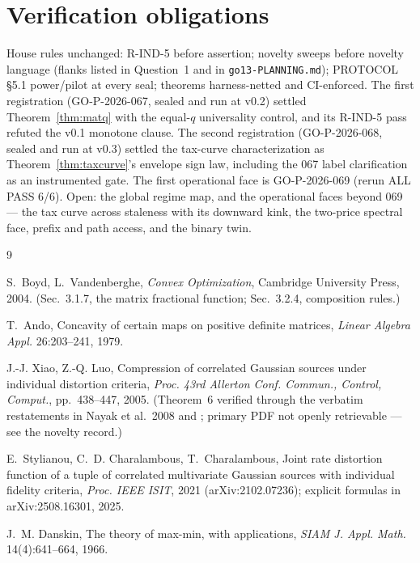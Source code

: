 ﻿\documentclass[11pt]{article}
\theoremstyle{remark}
\begin{document}
\section{Verification obligations}

House rules unchanged: R-IND-5 before assertion; novelty sweeps before
novelty language (flanks listed in Question~1 and in
\texttt{go13-PLANNING.md}); PROTOCOL \S5.1 power/pilot at every seal;
theorems harness-netted and CI-enforced. The first registration
(GO-P-2026-067, sealed and run at v0.2) settled
Theorem~\ref{thm:matq} with the equal-$q$ universality control, and
its R-IND-5 pass refuted the v0.1 monotone clause. The second
registration (GO-P-2026-068, sealed and run at v0.3) settled the
tax-curve characterization as Theorem~\ref{thm:taxcurve}'s envelope
sign law, including the 067 label clarification as an instrumented
gate. The first operational face is GO-P-2026-069 (rerun ALL PASS
6/6). Open: the global regime map, and the operational faces beyond
069 --- the tax curve across staleness with its downward kink, the
two-price spectral face, prefix and path access, and the binary twin.

\begin{thebibliography}{9}

 S.~Boyd, L.~Vandenberghe, \emph{Convex
Optimization}, Cambridge University Press, 2004. (Sec.~3.1.7, the
matrix fractional function; Sec.~3.2.4, composition rules.)

 T.~Ando, Concavity of certain maps on positive
definite matrices, \emph{Linear Algebra Appl.} 26:203--241, 1979.

 J.-J. Xiao, Z.-Q. Luo, Compression of
correlated Gaussian sources under individual distortion criteria,
\emph{Proc. 43rd Allerton Conf. Commun., Control, Comput.},
pp.~438--447, 2005. (Theorem~6 verified through the verbatim
restatements in Nayak et al.\ 2008 and \cite{bib:stylianou2021};
primary PDF not openly retrievable --- see the novelty record.)

 E.~Stylianou, C.~D. Charalambous,
T.~Charalambous, Joint rate distortion function of a tuple of
correlated multivariate Gaussian sources with individual fidelity
criteria, \emph{Proc. IEEE ISIT}, 2021 (arXiv:2102.07236); explicit
formulas in arXiv:2508.16301, 2025.

 J.~M. Danskin, The theory of max-min, with
applications, \emph{SIAM J. Appl. Math.} 14(4):641--664, 1966.

\end{thebibliography}
\end{document}
